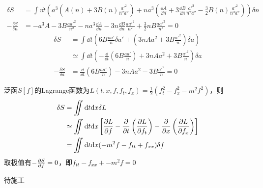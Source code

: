 \begin{solution}
    \[
        \begin{aligned}
            \delta S & = \int \dd t \left(a^3\left(A(n) + 3B(n) \frac{a'^2}{n^2 a^2}\right) + n a^3 \left(\frac{\dd A}{\dd n} + 3\frac{\dd B}{\dd n}\frac{a'^2}{n^2 a^2} - \frac{3}{2}B(n)\frac{a'^2}{n^3 a^2}\right)\right) \delta n\\
            -\frac{\delta S}{\delta n} & = -a^3 A - 3B \frac{a a'^2}{n^2} - n a^3 \frac{\dd A}{\dd n} - 3n \frac{\dd B}{\dd n} \frac{a a'^2}{n^2} + \frac{3}{2}nB\frac{a a'^2}{n^3} = 0
        \end{aligned}
    \]
    \[
        \begin{aligned}
            \delta S & = \int \dd t \left(6 B \frac{a a'}{n} \delta a' + \left(3 n A a^2 + 3 B \frac{a'^2}{n}\right)\delta a\right) \\
            & \simeq \int \dd t \left(- \frac{\dd}{\dd t}\left(6 B \frac{a a'}{n}\right) + 3 n A a^2 + 3 B \frac{a'^2}{n}\right) \delta a \\
            - \frac{\delta S}{\delta a} & = \frac{\dd}{\dd t}\left(6 B \frac{a a'}{n}\right) - 3 n A a^2 - 3 B \frac{a'^2}{n} = 0
        \end{aligned}
    \]
\end{solution}

\begin{solution}
    泛函\(S[f]\)的Lagrange函数为\(L(t,x,f,f_t,f_x) = \frac12(f_t^2-f_x^2-m^2f^2)\)，则
    \[
    \begin{aligned}
        \delta S & = \iint \dd t \dd x \delta L \\
                 & \simeq \iint \dd t \dd x \left[
                    \frac{\partial L}{\partial f} - \frac{\partial}{\partial t}\left( \frac{\partial L}{\partial f_t} \right) - \frac{\partial}{\partial x}\left( \frac{\partial L}{\partial f_x} \right)
                    \right] \\
                 & = \iint \dd t \dd x  
                 (-m^2f - f_{tt} + f_{xx})
                 \delta f
    \end{aligned}
    \]
    取极值有\(-\frac{\partial S}{\partial f}=0\)，即\(f_{tt} - f_{xx} + -m^2f = 0\)
\end{solution}

\begin{solution}
    待施工
\end{solution}


